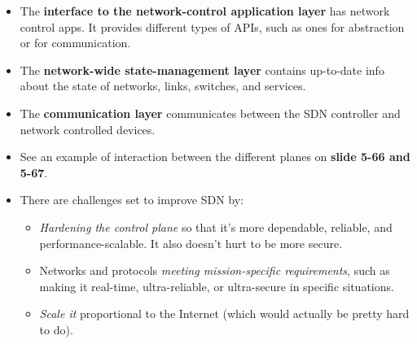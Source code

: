 \documentclass{article}
\begin{document}
\begin{itemize}
\item The {\bf interface to the network-control application layer} has network control apps. It provides different types of APIs, such as ones for abstraction or for communication.
\item The {\bf network-wide state-management layer} contains up-to-date info about the state of networks, links, switches, and services.
\item The {\bf communication layer} communicates between the SDN controller and network controlled devices.
\item See an example of interaction between the different planes on {\bf slide 5-66 and 5-67}.
\item There are challenges set to improve SDN by:
\begin{itemize}
\item \emph{Hardening the control plane} so that it's more dependable, reliable, and performance-scalable. It also doesn't hurt to be more secure.
\item Networks and protocols \emph{meeting mission-specific requirements}, such as making it real-time, ultra-reliable, or ultra-secure in specific situations.
\item \emph{Scale it} proportional to the Internet (which would actually be pretty hard to do).
\end{itemize}
\end{itemize}
\end{document}
